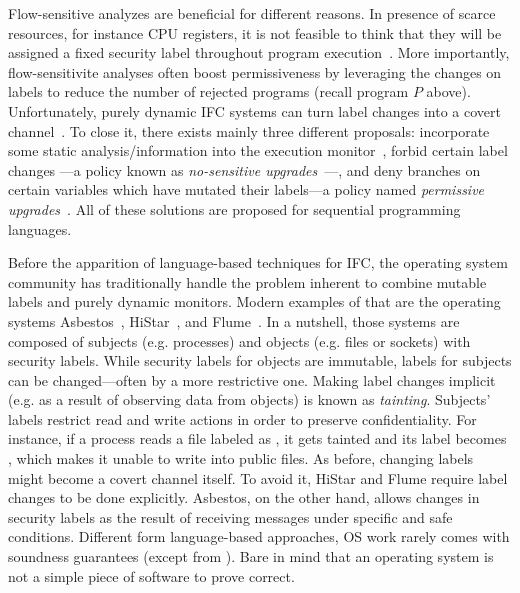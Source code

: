 
Flow-sensitive analyzes are beneficial for different reasons. In presence of
scarce resources, for instance CPU registers, it is not feasible to think that
they will be assigned a fixed security label throughout program
execution~\citep{BonelliCM05}. More importantly, flow-sensitivite analyses often
boost permissiveness by leveraging the changes on labels to reduce the number of
rejected programs (recall program $P$ above). Unfortunately, purely dynamic IFC
systems can turn label changes into a covert channel~\citep{Russo:2010}. To
close it, there exists mainly three different proposals:
incorporate some static analysis/information into the execution
monitor~\citep{Russo:2010,stefan:lio,10.1109/SP.2013.10}, forbid certain label
changes ---a policy known as \emph{no-sensitive
  upgrades}~\citep{Austin:Flanagan:PLAS10}---, and deny branches on certain
variables which have mutated their labels---a policy named \emph{permissive
  upgrades}~\citep{Austin:Flanagan:PLAS10}. All of these solutions are proposed
for sequential programming languages.


Before the apparition of language-based techniques for IFC, the operating system
community has traditionally handle the problem inherent to combine mutable
labels and purely dynamic monitors. Modern examples of that are the operating
systems Asbestos~\citep{Efstathopoulos:2005}, HiStar~\citep{zeldovich:histar},
and Flume~\citep{krohn:flume}. In a nutshell, those systems are composed of
subjects (e.g. processes) and objects (e.g. files or sockets) with security
labels. While security labels for objects are immutable, labels for subjects can
be changed---often by a more restrictive one. Making label changes implicit
(e.g. as a result of observing data from objects) is known as
\emph{tainting}. Subjects' labels restrict read and write actions in order to
preserve confidentiality. For instance, if a process reads a file labeled as
\high, it gets tainted and its label becomes \high, which makes it unable to
write into public files. As before, changing labels might become a covert
channel itself. To avoid it, HiStar and Flume require label changes to be done
explicitly.  Asbestos, on the other hand, allows changes in security labels as
the result of receiving messages under specific and safe conditions. Different
form language-based approaches, OS work rarely comes with soundness guarantees
(except from \citep{Krohn,seL4IF}). Bare in mind that an operating system is not
a simple piece of software to prove correct.


